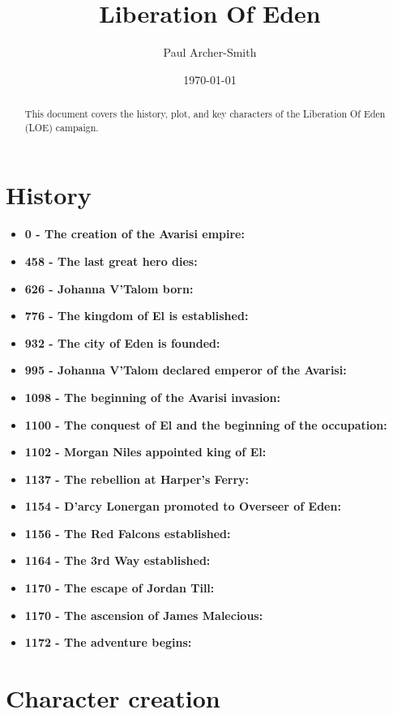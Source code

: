 \documentclass[letterpaper,12pt]{article}
\begin{document}
\title{Liberation Of Eden}
\author{Paul Archer-Smith}
\date{\today}
\maketitle

\begin{abstract}
This document covers the history, plot, and key characters of the Liberation Of Eden (LOE) campaign. 
\end{abstract}


\section{History}\label{History}

\begin{itemize}
\item \textbf{0 - The creation of the Avarisi empire:} 
\item \textbf{458 - The last great hero dies:} 
\item \textbf{626 - Johanna V'Talom born:} 
\item \textbf{776 - The kingdom of El is established:} 
\item \textbf{932 - The city of Eden is founded:}
\item \textbf{995 - Johanna V'Talom declared emperor of the Avarisi:} 
\item \textbf{1098 - The beginning of the Avarisi invasion:} 
\item \textbf{1100 - The conquest of El and the beginning of the occupation:}
\item \textbf{1102 - Morgan Niles appointed king of El:} 
\item \textbf{1137 - The rebellion at Harper's Ferry:} 
\item \textbf{1154 - D'arcy Lonergan promoted to Overseer of Eden:}
\item \textbf{1156 - The Red Falcons established:}
\item \textbf{1164 - The 3rd Way established:}
\item \textbf{1170 - The escape of Jordan Till:} 
\item \textbf{1170 - The ascension of James Malecious:}
\item \textbf{1172 - The adventure begins:} 
\end{itemize}


\section{Character creation}\label{CharacterCreation}
\end{document}
